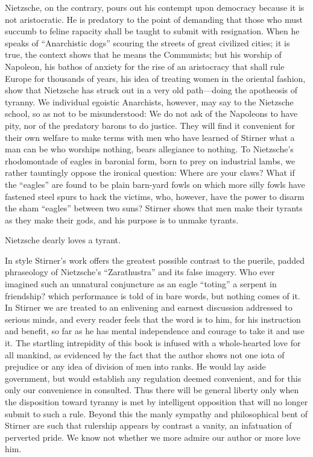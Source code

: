 Nietzsche, on the contrary, pours out his contempt upon democracy because it 
is not aristocratic. He is predatory to the point of demanding that those who 
must succumb to feline rapacity shall be taught to submit with resignation. 
When he speaks of ``Anarchistic dogs'' scouring the streets of great 
civilized cities; it is true, the context shows that he means the Communists; 
but his worship of Napoleon, his bathos of anxiety for the rise of an 
aristocracy that shall rule Europe for thousands of years, his idea of 
treating women in the oriental fashion, show that Nietzsche has struck out in 
a very old path---doing the apotheosis of tyranny. We individual egoistic 
Anarchists, however, may say to the Nietzsche school, so as not to be 
misunderstood: We do not ask of the Napoleons to have pity, nor of the 
predatory barons to do justice. They will find it convenient for their own 
welfare to make terms with men who have learned of Stirner what a man can be 
who worships nothing, bears allegiance to nothing. To Nietzsche's rhodomontade 
of eagles in baronial form, born to prey on industrial lambs, we rather 
tauntingly oppose the ironical question: Where are your claws? What if the 
``eagles'' are found to be plain barn-yard fowls on which more silly fowls 
have fastened steel spurs to hack the victims, who, however, have the power to 
disarm the sham ``eagles'' between two suns? Stirner shows that men make 
their tyrants as they make their gods, and his purpose is to unmake tyrants.

Nietzsche dearly loves a tyrant.

In style Stirner's work offers the greatest possible contrast to the puerile, 
padded phraseology of Nietzsche's ``Zarathustra'' and its false imagery. Who 
ever imagined such an unnatural conjuncture as an eagle ``toting'' a serpent 
in friendship? which performance is told of in bare words, but nothing comes 
of it. In Stirner we are treated to an enlivening and earnest discussion 
addressed to serious minds, and every reader feels that the word is to him, 
for his instruction and benefit, so far as he has mental independence and 
courage to take it and use it. The startling intrepidity of this book is 
infused with a whole-hearted love for all mankind, as evidenced by the fact 
that the author shows not one iota of prejudice or any idea of division of men 
into ranks. He would lay aside government, but would establish any regulation 
deemed convenient, and for this only our convenience in consulted. Thus there 
will be general liberty only when the disposition toward tyranny is met by 
intelligent opposition that will no longer submit to such a rule. Beyond this 
the manly sympathy and philosophical bent of Stirner are such that rulership 
appears by contrast a vanity, an infatuation of perverted pride. We know not 
whether we more admire our author or more love him.

